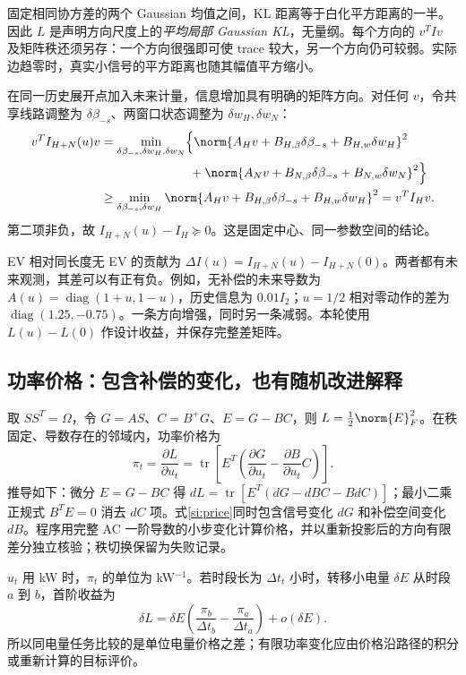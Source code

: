 固定相同协方差的两个 Gaussian 均值之间，KL 距离等于白化平方距离的一半。因此 $L$ 是声明方向尺度上的\emph{平均局部 Gaussian KL}，无量纲。每个方向的 $v^TIv$ 及矩阵秩还须另存：一个方向很强即可使 trace 较大，另一个方向仍可较弱。实际边趋零时，真实小信号的平方距离也随其幅值平方缩小。

在同一历史展开点加入未来计量，信息增加具有明确的矩阵方向。对任何 $v$，令共享线路调整为 $\delta\beta_{-s}$、两窗口状态调整为 $\delta w_H,\delta w_N$：
\begin{align}
 v^TI_{H+N}(u)v
 &=\min_{\delta\beta_{-s},\delta w_H,\delta w_N}
 \Bigl\{\norm{A_Hv+B_{H,\beta}\delta\beta_{-s}+B_{H,w}\delta w_H}^2\nonumber\\
 &\hspace{25mm}+\norm{A_Nv+B_{N,\beta}\delta\beta_{-s}+B_{N,w}\delta w_N}^2\Bigr\}\nonumber\\
 &\ge\min_{\delta\beta_{-s},\delta w_H}
 \norm{A_Hv+B_{H,\beta}\delta\beta_{-s}+B_{H,w}\delta w_H}^2
 =v^TI_Hv.
 \label{si:history-monotone}
\end{align}
第二项非负，故 $I_{H+N}(u)-I_H\succeq0$。这是固定中心、同一参数空间的结论。

EV 相对同长度无 EV 的贡献为 $\Delta I(u)=I_{H+N}(u)-I_{H+N}(0)$。两者都有未来观测，其差可以有正有负。例如，无补偿的未来导数为 $A(u)=\operatorname{diag}(1+u,1-u)$，历史信息为 $0.01I_2$；$u=1/2$ 相对零动作的差为 $\operatorname{diag}(1.25,-0.75)$。一条方向增强，同时另一条减弱。本轮使用 $L(u)-L(0)$ 作设计收益，并保存完整差矩阵。

\subsection{功率价格：包含补偿的变化，也有随机改进解释}

取 $SS^T=\Omega$，令 $G=AS$、$C=B^+G$、$E=G-BC$，则 $L=\tfrac12\norm{E}_F^2$。在秩固定、导数存在的邻域内，功率价格为
\begin{equation}
 \boxed{\pi_t=\frac{\partial L}{\partial u_t}
 =\operatorname{tr}\!\left[E^T
 \left(\frac{\partial G}{\partial u_t}
       -\frac{\partial B}{\partial u_t}C\right)\right].}
 \label{si:price}
\end{equation}
推导如下：微分 $E=G-BC$ 得
$dL=\operatorname{tr}[E^T(dG-dBC-BdC)]$；最小二乘正规式 $B^TE=0$ 消去 $dC$ 项。式\eqref{si:price}同时包含信号变化 $dG$ 和补偿空间变化 $dB$。程序用完整 AC 一阶导数的小步变化计算价格，并以重新投影后的方向有限差分独立核验；秩切换保留为失败记录。

$u_t$ 用 kW 时，$\pi_t$ 的单位为 kW$^{-1}$。若时段长为 $\Delta t_t$ 小时，转移小电量 $\delta E$ 从时段 $a$ 到 $b$，首阶收益为
\begin{equation}
 \delta L=\delta E\left(\frac{\pi_b}{\Delta t_b}-\frac{\pi_a}{\Delta t_a}\right)+o(\delta E).
 \label{si:energy-price}
\end{equation}
所以同电量任务比较的是单位电量价格之差；有限功率变化应由价格沿路径的积分或重新计算的目标评价。


